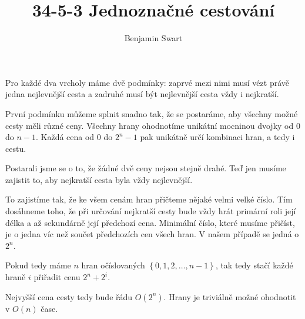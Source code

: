 \documentclass{article}
\title{34-5-3 Jednoznačné cestování}
\author{Benjamin Swart}
\begin{document}
\maketitle

Pro každé dva vrcholy máme dvě podmínky: zaprvé mezi nimi musí vézt právě jedna nejlevnější cesta a zadruhé musí být nejlevnější cesta vždy i nejkratší.

První podmínku můžeme splnit snadno tak, že se postaráme, aby všechny možné cesty měli různé ceny. Všechny hrany ohodnotíme unikátní mocninou dvojky od \(0\) do \(n-1\). Každá cena od \(0\) do \(2^n-1\) pak unikátně určí kombinaci hran, a tedy i cestu.

Postarali jsme se o to, že žádné dvě ceny nejsou stejně drahé. Teď jen musíme zajistit to, aby nejkratší cesta byla vždy nejlevnější.

To zajistíme tak, že ke všem cenám hran přičteme nějaké velmi velké číslo. Tím dosáhneme toho, že při určování nejkratší cesty bude vždy hrát primární roli její délka a až sekundárně její předchozí cena. Minimální číslo, které musíme přičíst, je o jedna víc než součet předchozích cen všech hran. V našem případě se jedná o \(2^n\).

Pokud tedy máme \(n\) hran očíslovaných \(\left\{0, 1, 2, \dots, n - 1\right\}\), tak tedy stačí každé hraně \(i\) přiřadit cenu \(2^n + 2^i\).

Nejvyšší cena cesty tedy bude řádu \(O(2^n)\). Hrany je triviálně možné ohodnotit v \(O(n)\) čase.
\end{document}
